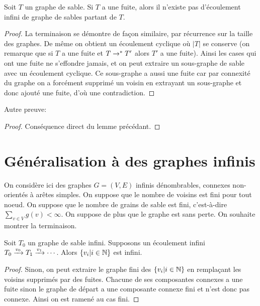 \begin{theo}
Soit $T$ un graphe de sable. Si $T$ a une fuite, alors il n'existe pas d'écoulement infini de graphe de sables partant de $T$.
\end{theo}
\begin{proof}
%
% 
%
La terminaison se démontre de façon similaire, par récurrence sur la taille des graphes. De même on obtient un écoulement cyclique où $|T|$ se conserve (on remarque que si $T$ a une fuite et $T\rightarrow^*T'$ alors $T'$ a une fuite). Ainsi les cases qui ont une fuite ne s'effondre jamais, et on peut extraire un sous-graphe de sable avec un écoulement cyclique. Ce sous-graphe a aussi une fuite car par connexité du graphe on a forcément supprimé un voisin en extrayant un sous-graphe et donc ajouté une fuite, d'où une contradiction.
\end{proof}

Autre preuve:
\begin{proof}
Conséquence direct du lemme précédant.
\end{proof}
\section{Généralisation à des graphes infinis}
On considère ici des graphes $G=(V,E)$ infinis dénombrables, connexes non-orientés à arêtes simples. On suppose que le nombre de voisins est fini pour tout noeud. On suppose que le nombre de grains de sable est fini, c'est-à-dire $\sum_{v\in V} g(v)<\infty$. On suppose de plus que le graphe est sans perte. On souhaite montrer la terminaison. %

\begin{lem}
\label{fuiteinfini}
Soit $T_0$ un graphe de sable infini. Supposons un écoulement infini $T_0\xrightarrow{v_0}T_1\xrightarrow{v_1}\cdots$. Alors $\{v_i|i\in\mathbb{N}\}$ est infini.
\end{lem}
\begin{proof}
Sinon, on peut extraire le graphe fini des $\{v_i|i\in\mathbb{N}\}$ en remplaçant les voisins supprimés par des fuites. Chacune de ses composantes connexes a une fuite sinon le graphe de départ a une composante connexe fini et n'est donc pas connexe. Ainsi on est ramené au cas fini.
\end{proof}

